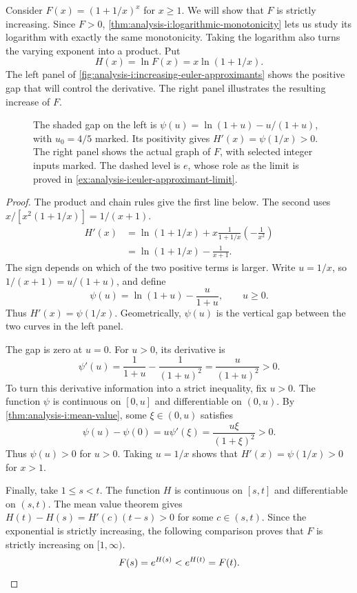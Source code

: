 \begin{example}
  \label{ex:analysis-i:increasing-euler-approximants}
  Consider $F(x)=(1+1/x)^x$ for $x\ge1$. We will
  show that $F$ is strictly increasing. Since $F>0$,
  \autoref{thm:analysis-i:logarithmic-monotonicity} lets us study its
  logarithm with exactly the same monotonicity. Taking the logarithm
  also turns the varying exponent into a product. Put
  \[
    H(x)=\ln F(x)=x\ln(1+1/x).
  \]
  The left panel of \autoref{fig:analysis-i:increasing-euler-approximants}
  shows the positive gap that will control the derivative. The right
  panel illustrates the resulting increase of $F$.
  \begin{figure}[htbp]
    \centering
    
    \caption[The gap behind increasing approximants.]{%
      The shaded gap on the left is
      $\psi(u)=\ln(1+u)-u/(1+u)$, with $u_0=4/5$ marked.
      Its positivity gives $H'(x)=\psi(1/x)>0$.
      The right panel shows the actual graph of $F$, with selected
      integer inputs marked. The dashed level is $e$, whose role as
      the limit is proved in
      \autoref{ex:analysis-i:euler-approximant-limit}.}
    \label{fig:analysis-i:increasing-euler-approximants}
  \end{figure}
  \begin{proof}
  The product and chain rules give the first line below. The second
  uses $x/[x^2(1+1/x)]=1/(x+1)$.
  \[
    \begin{aligned}
      H'(x)&=\ln(1+1/x)
        +x\frac{1}{1+1/x}\left(-\frac1{x^2}\right)\\
        &=\ln(1+1/x)-\frac1{x+1}.
    \end{aligned}
  \]
  The sign depends on which of the two positive terms is larger.
  Write $u=1/x$, so $1/(x+1)=u/(1+u)$, and define
  \[
    \psi(u)=\ln(1+u)-\frac{u}{1+u},\qquad u\ge0.
  \]
  Thus $H'(x)=\psi(1/x)$. Geometrically, $\psi(u)$ is the vertical
  gap between the two curves in the left panel.

  The gap is zero at $u=0$. For $u>0$, its derivative is
  \[
    \psi'(u)=\frac1{1+u}-\frac1{(1+u)^2}
      =\frac{u}{(1+u)^2}>0.
  \]
  To turn this derivative information into a strict inequality, fix
  $u>0$. The function $\psi$ is continuous on $[0,u]$ and differentiable
  on $(0,u)$. By \autoref{thm:analysis-i:mean-value}, some
  $\xi\in(0,u)$ satisfies
  \[
    \psi(u)-\psi(0)=u\psi'(\xi)
      =\frac{u\xi}{(1+\xi)^2}>0.
  \]
  Thus $\psi(u)>0$ for $u>0$. Taking $u=1/x$ shows that
  $H'(x)=\psi(1/x)>0$ for $x>1$.

  Finally, take $1\le s<t$. The function $H$ is continuous on $[s,t]$
  and differentiable on $(s,t)$. The mean value theorem gives
  $H(t)-H(s)=H'(c)(t-s)>0$ for some $c\in(s,t)$.
  Since the exponential is strictly increasing, the following comparison
  proves that $F$ is strictly increasing on $[1,\infty)$.
  \[
    F(s)=e^{H(s)}<e^{H(t)}=F(t). \qedhere
  \]
  \end{proof}
\end{example}

